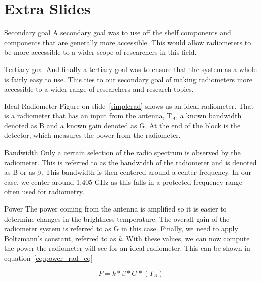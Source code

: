 \documentclass{beamer}
\begin{document}
\section*{Extra Slides}

\begin{frame}
\begin{block}{Secondary goal}
A secondary goal was to use off the shelf components and components that are generally more accessible.  This would allow radiometers to be more accessible to a wider scope of researchers in this field.
\end{block} 

\begin{block}{Tertiary goal}
And finally a tertiary goal was to ensure that the system as a whole is fairly easy to use.  This ties to our secondary goal of making radiometers more accessible to a wider range of researchers and research topics.
\end{block}
\end{frame}

\begin{frame}
\begin{block}{Ideal Radiometer}
Figure on slide~\ref{simplerad} shows us an ideal radiometer.  That is a radiometer that has an input from the antenna, T$_{A}$, a known bandwidth denoted as B and a known gain denoted as G.  At the end of the block is the detector, which measures the power from the radiometer.
\end{block}
\end{frame}

\begin{frame}
\begin{block}{Bandwidth}
Only a certain selection of the radio spectrum is observed by the radiometer.  This is referred to as the bandwidth of the radiometer and is denoted as B or as $\beta$.  This bandwidth is then centered around a center frequency.  In our case, we center around 1.405 GHz as this falls in a protected frequency range often used for radiometry.  
\end{block}
\end{frame}

\begin{frame}
\begin{block}{Power}
The power coming from the antenna is amplified so it is easier to determine changes in the brightness temperature.  The overall gain of the radiometer system is referred to as G in this case.  Finally, we need to apply Boltzmann's constant, referred to as \textit{k}.  With these values, we can now compute the power the radiometer will see for an ideal radiometer.  This can be shown in equation~\ref{eq:power_rad_eq}

\begin{equation} \label{eq:power_rad_eq}
P=k*\beta*G*(T_{A})
\end{equation}
\end{block}

\end{frame}
\end{document}
